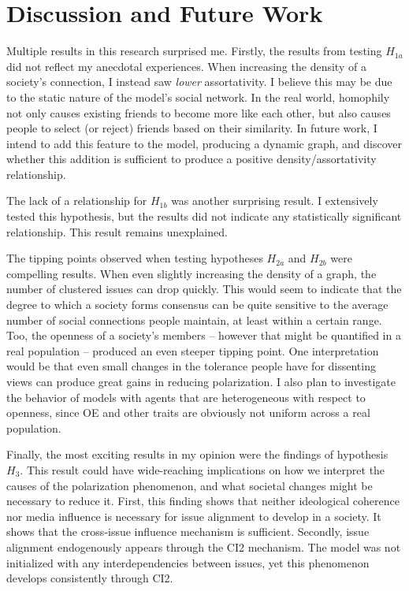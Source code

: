 \section{Discussion and Future Work}

Multiple results in this research surprised me. Firstly, the results from
testing $H_{1a}$ did not reflect my anecdotal experiences. When increasing the
density of a society's connection, I instead saw \textit{lower} assortativity.
I believe this may be due to the static nature of the model's social network.
In the real world, homophily not only causes existing friends to become more
like each other, but also causes people to select (or reject) friends based on
their similarity. In future work, I intend to add this feature to the model,
producing a dynamic graph, and discover whether this addition is sufficient to
produce a positive density/assortativity relationship.

The lack of a relationship for $H_{1b}$ was another surprising result. I
extensively tested this hypothesis, but the results did not indicate any
statistically significant relationship. This result remains unexplained.

The tipping points observed when testing hypotheses $H_{2a}$ and $H_{2b}$ were
compelling results. When even slightly increasing the density of a graph, the
number of clustered issues can drop quickly. This would seem to indicate that
the degree to which a society forms consensus can be quite sensitive to the
average number of social connections people maintain, at least within a certain
range. Too, the openness of a society's members -- however that might be
quantified in a real population -- produced an even steeper tipping point. One
interpretation would be that even small changes in the tolerance people have
for dissenting views can produce great gains in reducing polarization. I also
plan to investigate the behavior of models with agents that are heterogeneous 
with respect to openness, since OE and other traits are obviously not uniform
across a real population.

Finally, the most exciting results in my opinion were the findings of hypothesis $H_{3}$. This result could have wide-reaching implications on how we interpret the causes of the polarization phenomenon, and what societal changes might be necessary to reduce it. First, this finding shows that neither ideological coherence nor media influence is necessary for issue alignment to develop in a society. It shows that the cross-issue influence mechanism is sufficient. Secondly, issue alignment endogenously appears through the CI2 mechanism. The model was not initialized with any interdependencies between issues, yet this phenomenon develops consistently through CI2. 

